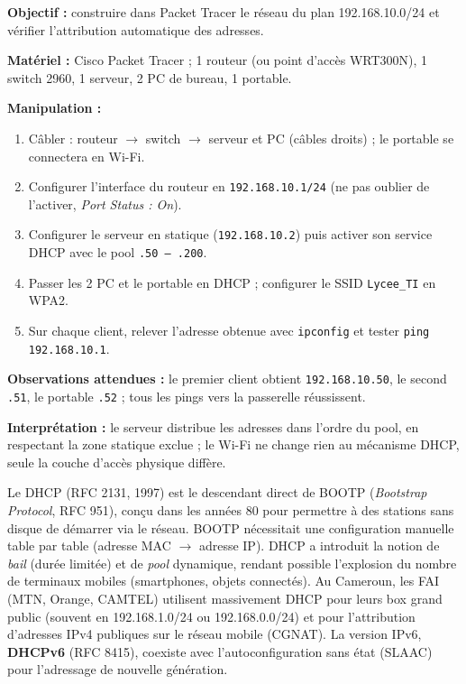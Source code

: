 \documentclass[11pt]{article}
\begin{document}
\begin{experience}
\textbf{Objectif :} construire dans Packet Tracer le réseau du plan 192.168.10.0/24 et vérifier l'attribution automatique des adresses.\par
\textbf{Matériel :} Cisco Packet Tracer ; 1 routeur (ou point d'accès WRT300N), 1 switch 2960, 1 serveur, 2 PC de bureau, 1 portable.\par
\textbf{Manipulation :}
\begin{enumerate}
\item Câbler : routeur $\to$ switch $\to$ serveur et PC (câbles droits) ; le portable se connectera en Wi-Fi.
\item Configurer l'interface du routeur en \texttt{192.168.10.1/24} (ne pas oublier de l'activer, \emph{Port Status : On}).
\item Configurer le serveur en statique (\texttt{192.168.10.2}) puis activer son service DHCP avec le pool \texttt{.50 -- .200}.
\item Passer les 2 PC et le portable en DHCP ; configurer le SSID \texttt{Lycee\_TI} en WPA2.
\item Sur chaque client, relever l'adresse obtenue avec \texttt{ipconfig} et tester \texttt{ping 192.168.10.1}.
\end{enumerate}
\textbf{Observations attendues :} le premier client obtient \texttt{192.168.10.50}, le second \texttt{.51}, le portable \texttt{.52} ; tous les pings vers la passerelle réussissent.\par
\textbf{Interprétation :} le serveur distribue les adresses dans l'ordre du pool, en respectant la zone statique exclue ; le Wi-Fi ne change rien au mécanisme DHCP, seule la couche d'accès physique diffère.
\end{experience}

\begin{savaistu}
Le DHCP (RFC 2131, 1997) est le descendant direct de BOOTP (\emph{Bootstrap Protocol}, RFC 951), conçu dans les années 80 pour permettre à des stations sans disque de démarrer via le réseau. BOOTP nécessitait une configuration manuelle table par table (adresse MAC $\to$ adresse IP). DHCP a introduit la notion de \emph{bail} (durée limitée) et de \emph{pool} dynamique, rendant possible l'explosion du nombre de terminaux mobiles (smartphones, objets connectés). Au Cameroun, les FAI (MTN, Orange, CAMTEL) utilisent massivement DHCP pour leurs box grand public (souvent en 192.168.1.0/24 ou 192.168.0.0/24) et pour l'attribution d'adresses IPv4 publiques sur le réseau mobile (CGNAT). La version IPv6, \textbf{DHCPv6} (RFC 8415), coexiste avec l'autoconfiguration sans état (SLAAC) pour l'adressage de nouvelle génération.
\end{savaistu}
\end{document}
